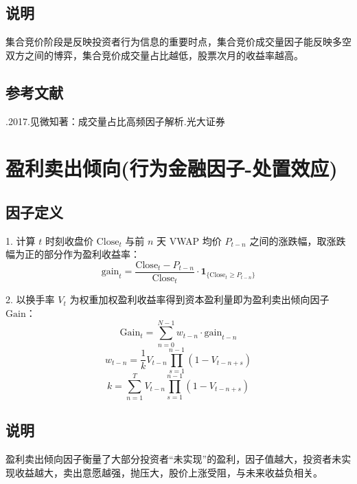 \documentclass{article}
\begin{document}
\subsection{说明}
集合竞价阶段是反映投资者行为信息的重要时点，集合竞价成交量因子能反映多空双方之间的博弈，集合竞价成交量占比越低，股票次月的收益率越高。

\subsection{参考文献}
\begin{enumerate}
    .2017.见微知著：成交量占比高频因子解析.光大证券
\end{enumerate}

\section{盈利卖出倾向(行为金融因子-处置效应)}

\subsection{因子定义}

1. 计算 \( t \) 时刻收盘价 \( \mathrm{Close}_t \) 与前 \( n \) 天 VWAP 均价 \( P_{t-n} \) 之间的涨跌幅，取涨跌幅为正的部分作为盈利收益率：
\begin{equation}
    \mathrm{gain}_t = \frac{\mathrm{Close}_t - P_{t-n}}{\mathrm{Close}_t} \cdot \mathbf{1}_{\{\mathrm{Close}_t \geq P_{t-n}\}}
\end{equation}

2. 以换手率 \( V_t \) 为权重加权盈利收益率得到资本盈利量即为盈利卖出倾向因子 \( \mathrm{Gain} \)：
\begin{equation}
    \mathrm{Gain}_t = \sum_{n=0}^{N-1} w_{t-n} \cdot \mathrm{gain}_{t-n}
\end{equation}
\begin{equation}
    w_{t-n} = \frac{1}{k} V_{t-n} \prod_{s=1}^{n-1} (1 - V_{t-n+s})
\end{equation}
\begin{equation}
    k = \sum_{n=1}^{T} V_{t-n} \prod_{s=1}^{n-1} (1 - V_{t-n+s})
\end{equation}

\subsection{说明}
盈利卖出倾向因子衡量了大部分投资者“未实现”的盈利，因子值越大，投资者未实现收益越大，卖出意愿越强，抛压大，股价上涨受阻，与未来收益负相关。
\end{document}
